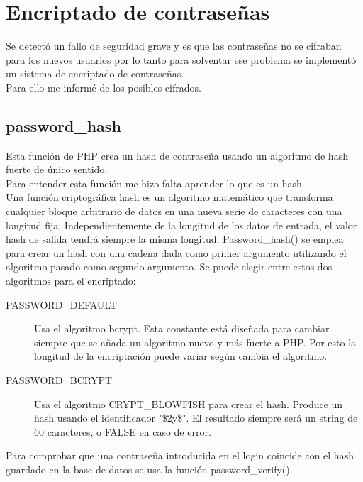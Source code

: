 \section{Encriptado de contraseñas}
Se detectó un fallo de seguridad grave y es que las contraseñas no se cifraban para los nuevos usuarios por lo tanto para solventar ese problema se implementó un sistema de encriptado de contraseñas.\\
Para ello me informé de los posibles cifrados.
\subsection{password\_hash}
Esta función de PHP crea un hash de contraseña usando un algoritmo de hash fuerte de único sentido.\\
Para entender esta función me hizo falta aprender lo que es un hash.\\
Una función criptográfica hash es un algoritmo matemático que transforma cualquier bloque arbitrario de datos en una nueva serie de caracteres con una longitud fija. Independientemente de la longitud de los datos de entrada, el valor hash de salida tendrá siempre la misma longitud.\cite{definicionHash}
Password\_hash() se emplea para crear un hash con una cadena dada como primer argumento utilizando el algoritmo pasado como segundo argumento. 
Se puede elegir entre estos dos algoritmos para el encriptado:
\begin{description}
    \item [PASSWORD\_DEFAULT] Usa el algoritmo bcrypt. Esta constante está diseñada para cambiar siempre que se añada un algoritmo nuevo y más fuerte a PHP. Por esto la longitud de la encriptación puede variar según cambia el algoritmo.
    \item [PASSWORD\_BCRYPT] Usa el algoritmo CRYPT\_BLOWFISH para crear el hash. Produce un hash usando el identificador "\$2y\$". El resultado siempre será un string de 60 caracteres, o FALSE en caso de error.
\end{description}
Para comprobar que una contraseña introducida en el login coincide con el hash guardado en la base de datos se usa la función password\_verify().\cite{passwordHash}
